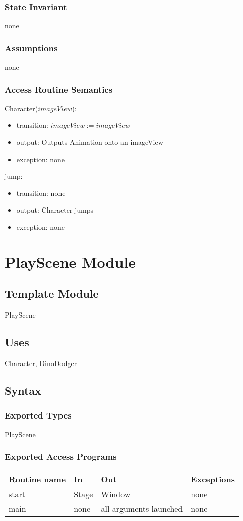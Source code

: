 \documentclass[12pt, titlepage]{article}
\begin{document}
\subsubsection {State Invariant}
none
\subsubsection {Assumptions}
none
\subsubsection {Access Routine Semantics}
Character($imageView$):
\begin{itemize}
\item transition: $imageView := imageView$ 
\item output: Outputs Animation onto an imageView
\item exception: none
\end{itemize}
\noindent jump:
\begin{itemize}
\item transition: none
\item output: Character jumps
\item exception: none
\end{itemize}

\newpage
\section {PlayScene Module}
\subsection{Template Module}
PlayScene
\subsection {Uses}
Character, DinoDodger
\subsection {Syntax}
\subsubsection {Exported Types}
PlayScene
\subsubsection {Exported Access Programs}
\begin{tabular}{| l | l | l | l |}
\hline
\textbf{Routine name} & \textbf{In} & \textbf{Out} & \textbf{Exceptions}\\
\hline
start & Stage & Window & none\\
\hline
main & none & all arguments launched & none\\
\hline
\end{tabular}
\end{document}

